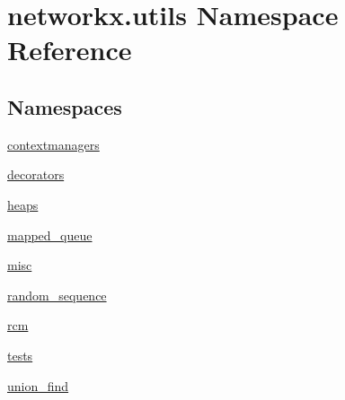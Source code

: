 \hypertarget{namespacenetworkx_1_1utils}{}\section{networkx.\+utils Namespace Reference}
\label{namespacenetworkx_1_1utils}
\subsection*{Namespaces}
\begin{DoxyCompactItemize}
\item 
 \hyperlink{namespacenetworkx_1_1utils_1_1contextmanagers}{contextmanagers}
\item 
 \hyperlink{namespacenetworkx_1_1utils_1_1decorators}{decorators}
\item 
 \hyperlink{namespacenetworkx_1_1utils_1_1heaps}{heaps}
\item 
 \hyperlink{namespacenetworkx_1_1utils_1_1mapped__queue}{mapped\+\_\+queue}
\item 
 \hyperlink{namespacenetworkx_1_1utils_1_1misc}{misc}
\item 
 \hyperlink{namespacenetworkx_1_1utils_1_1random__sequence}{random\+\_\+sequence}
\item 
 \hyperlink{namespacenetworkx_1_1utils_1_1rcm}{rcm}
\item 
 \hyperlink{namespacenetworkx_1_1utils_1_1tests}{tests}
\item 
 \hyperlink{namespacenetworkx_1_1utils_1_1union__find}{union\+\_\+find}
\end{DoxyCompactItemize}
